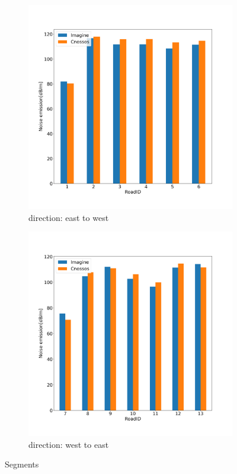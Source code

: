 \documentclass{article}
\begin{document}
\begin{figure}[h]
     \centering
     \begin{subfigure}[H]{0.47\textwidth}
         \centering
         \includegraphics[width=\textwidth]{first30s(up).png}
         \caption{direction: east to west}
         \label{R2L}
     \end{subfigure}
     \hfill
     \begin{subfigure}[H]{0.47\textwidth}
         \centering
         \includegraphics[width=\textwidth]{first30s(down).png}
         \caption{direction: west to east}
         \label{L2R}
     \end{subfigure}
\caption{{\color{red} Segments}}
\label{Segments in target road}
\end{figure}
\end{document}
